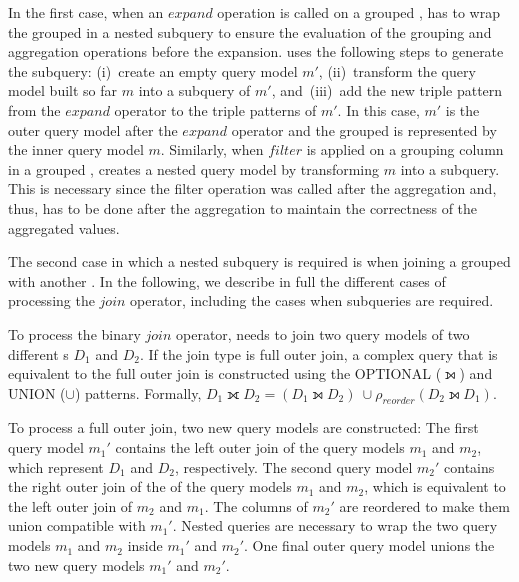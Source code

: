 In the first case, when an $expand$ operation is called on a grouped \rdfframe, \rdfframes has to wrap the grouped \rdfframe in a nested subquery to ensure the evaluation of the grouping and aggregation operations before the expansion. 
\rdfframes uses the following steps to generate the subquery: (i)~create an empty query model $m'$, (ii)~transform the query model built so far $m$ into a subquery of $m'$, and~(iii)~add the new triple pattern from the $expand$ operator to the triple patterns of $m'$. In this case, $m'$ is the outer query model after the $expand$ operator and the grouped \rdfframe is represented by the inner query model $m$. Similarly, when $filter$ is applied on a grouping column in a grouped \rdfframe, \rdfframes creates a nested query model by transforming $m$ into a subquery. This is necessary since the filter operation was called after the aggregation and, thus, has to be done after the aggregation to maintain the correctness of the aggregated values. 


The second case in which a nested subquery is required is when joining a grouped \rdfframe with another \rdfframe.
In the following, we describe in full the different cases of processing the $join$ operator, including the cases when subqueries are required.

To process the binary $join$ operator, \rdfframes needs to join two query models of two different {\rdfframe}s $D_1$ and $D_2$. If the join type is full outer join, a complex query that is equivalent to the full outer join
is constructed using the \sparql
OPTIONAL ($\leftouterjoin$) and UNION ($\cup$) patterns. 
Formally, $D_1 \fullouterjoin D_2 = (D_1 \leftouterjoin D_2)\ \cup \rho_{reorder} (D_2   \leftouterjoin D_1)$.


To process a full outer join, two new query models are constructed: 
The first query model ${m_1}{'}$ contains the left outer join of the query models $m_1$ and $m_2$, which represent $D_1$ and $D_2$, respectively.
The second query model ${m_2}{'}$ contains the right outer join of the of the query models $m_1$ and $m_2$, which is equivalent to the left outer join of $m_2$ and $m_1$. The columns of ${m_2}{'}$ are reordered to make them union compatible with ${m_1}{'}$. Nested queries are necessary to wrap the two query models $m_1$ and $m_2$ inside ${m_1}{'}$ and ${m_2}{'}$.
One final outer query model unions the two new query models ${m_1}{'}$ and ${m_2}{'}$.


